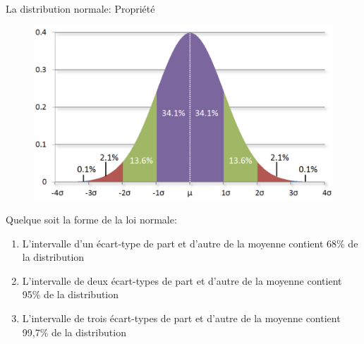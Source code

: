 \documentclass[ignorenonframetext,]{beamer}
\begin{document}
\begin{frame}{La distribution normale: Propriété}

\begin{figure}
\centering
\includegraphics{Courbe_normale.png}
\caption{}
\end{figure}

Quelque soit la forme de la loi normale:

\begin{enumerate}
\def\labelenumi{\arabic{enumi}.}
\item
  L'intervalle d'un écart-type de part et d'autre de la moyenne contient
  68\% de la distribution
\item
  L'intervalle de deux écart-types de part et d'autre de la moyenne
  contient 95\% de la distribution
\item
  L'intervalle de trois écart-types de part et d'autre de la moyenne
  contient 99,7\% de la distribution
\end{enumerate}

\end{frame}
\end{document}
